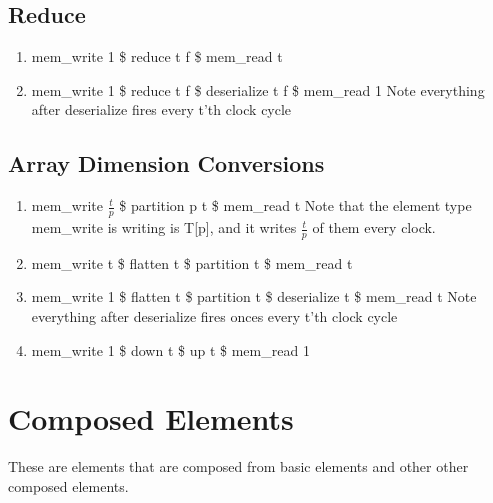 \documentclass[11pt,fleqn]{article}
\numberwithin{equation}{subsection}
\begin{document}
\subsection{Reduce}
\begin{enumerate}
    \item mem\_write 1 \$ reduce t f \$ mem\_read t
    \item mem\_write 1 \$ reduce t f \$ deserialize t f \$ mem\_read 1 
        \subitem Note everything after deserialize fires every t'th clock cycle
\end{enumerate}

\subsection{Array Dimension Conversions}
\begin{enumerate}
    \item mem\_write $\frac{t}{p}$ \$ partition p t \$ mem\_read t
        \subitem Note that the element type mem\_write is writing is T[p], 
        and it writes $\frac{t}{p}$ of them every clock.
    \item mem\_write t \$ flatten t \$ partition t \$ mem\_read t 
    \item mem\_write 1 \$ flatten t \$ partition t \$ deserialize t \$ mem\_read t
        \subitem Note everything after deserialize fires onces every t'th 
        clock cycle
    \item mem\_write 1 \$ down t \$ up t \$ mem\_read 1
\end{enumerate}

\section{Composed Elements}
These are elements that are composed from basic elements and other other composed
elements.
\end{document}
